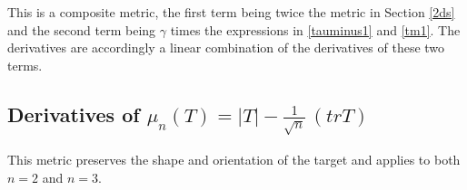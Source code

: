 \documentclass{report}
\begin{document}
\noindent This is a composite metric, the first term being twice the 
metric in Section \ref{2ds} and the second term being $\gamma$ times the
expressions in \ref{tauminus1} and \ref{tm1}. The derivatives are accordingly 
a linear combination of the derivatives of these two terms. \newline





\subsection{Derivatives of $\mu_n(T)=|T| - \frac{1}{\sqrt{n}} \, (tr T)$ \label{sho} }

\noindent This metric preserves the shape and orientation of the target and 
applies to both $n=2$ and $n=3$.  \newline
\end{document}
